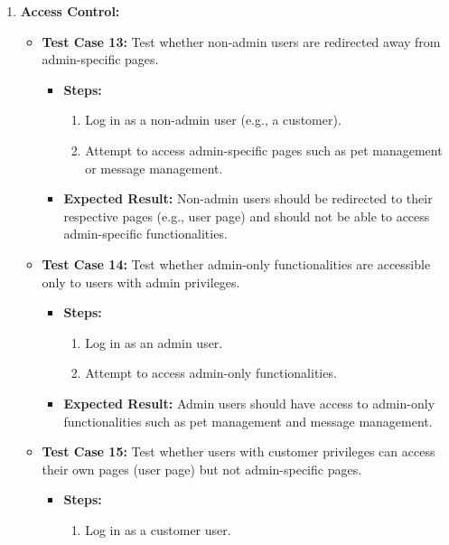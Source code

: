 \begin{enumerate}
\begin{itemize}
\begin{itemize}
        \end{itemize}
    \end{itemize}
    \item \textbf{Access Control:}
        \begin{itemize}
        \item \textbf{Test Case 13:} Test whether non-admin users are redirected away from admin-specific pages.
        \begin{itemize}
            \item \textbf{Steps:}
            \begin{enumerate}
                \item Log in as a non-admin user (e.g., a customer).
                \item Attempt to access admin-specific pages such as pet management or message management.
            \end{enumerate}
            \item \textbf{Expected Result:} Non-admin users should be redirected to their respective pages (e.g., user page) and should not be able to access admin-specific functionalities.
        \end{itemize}
        \item \textbf{Test Case 14:} Test whether admin-only functionalities are accessible only to users with admin privileges.
        \begin{itemize}
            \item \textbf{Steps:}
            \begin{enumerate}
                \item Log in as an admin user.
                \item Attempt to access admin-only functionalities.
            \end{enumerate}
            \item \textbf{Expected Result:} Admin users should have access to admin-only functionalities such as pet management and message management.
        \end{itemize}
        \item \textbf{Test Case 15:} Test whether users with customer privileges can access their own pages (user page) but not admin-specific pages.
        \begin{itemize}
            \item \textbf{Steps:}
            \begin{enumerate}
                \item Log in as a customer user.

\end{enumerate}
\end{itemize}
\end{itemize}
\end{enumerate}
